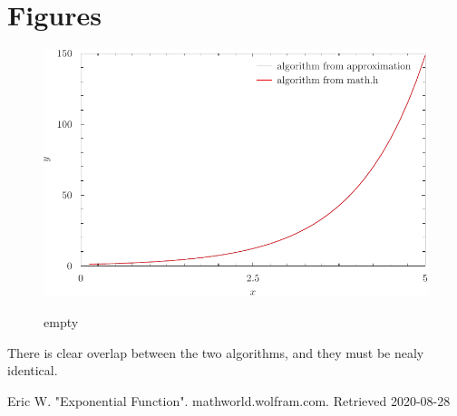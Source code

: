\documentclass{article}
\begin{document}
\section{Figures}
	\begin{figure}[H]\centering \label{fig:exponential function}
\includegraphics{fig-exp-pyxplot.pdf}
\caption{empty}
	\end{figure}
There is clear overlap between the two algorithms, and they must be nealy identical.

\begin{thebibliography}{9}
 Eric W. "Exponential Function". mathworld.wolfram.com. Retrieved 2020-08-28
\end{thebibliography}
\end{document}
